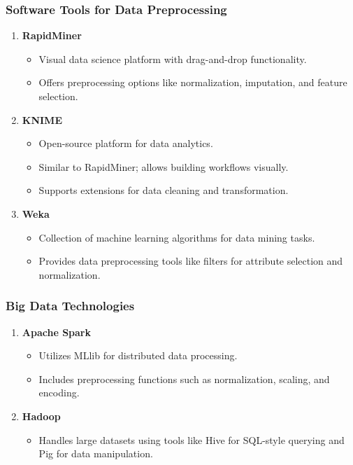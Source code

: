 \documentclass{beamer}
\begin{document}
\begin{frame}
    \frametitle{Software Tools for Data Preprocessing}
    \begin{enumerate}
        \item \textbf{RapidMiner}
            \begin{itemize}
                \item Visual data science platform with drag-and-drop functionality.
                \item Offers preprocessing options like normalization, imputation, and feature selection.
            \end{itemize}
        \item \textbf{KNIME}
            \begin{itemize}
                \item Open-source platform for data analytics.
                \item Similar to RapidMiner; allows building workflows visually.
                \item Supports extensions for data cleaning and transformation.
            \end{itemize}
        \item \textbf{Weka}
            \begin{itemize}
                \item Collection of machine learning algorithms for data mining tasks.
                \item Provides data preprocessing tools like filters for attribute selection and normalization.
            \end{itemize}
    \end{enumerate}
\end{frame}

\begin{frame}
    \frametitle{Big Data Technologies}
    \begin{enumerate}
        \item \textbf{Apache Spark}
            \begin{itemize}
                \item Utilizes MLlib for distributed data processing.
                \item Includes preprocessing functions such as normalization, scaling, and encoding.
            \end{itemize}
        \item \textbf{Hadoop}
            \begin{itemize}
                \item Handles large datasets using tools like Hive for SQL-style querying and Pig for data manipulation.
            \end{itemize}
    \end{enumerate}
\end{frame}
\end{document}
